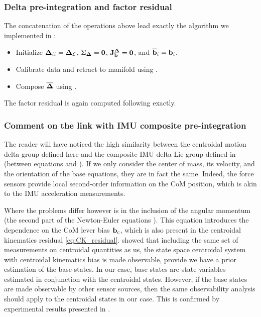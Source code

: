 \subsubsection{Delta pre-integration and factor residual}

The concatenation of the operations above lead exactly the algorithm we implemented in \cite{fourmy2021contact}:
%
\begin{itemize}
    \item Initialize ${{\bm \Delta}}_{ii} = {{\bm \Delta}}_{\mathcal{E}}$, $\Sigma_{{\bm \Delta}}=\bf0$, ${\bf J}^{{\bm \Delta}}_{\bf b} = \bf0$, and $\overline{{\bf b}}_i = {\bf b}_i$.
    \item Calibrate data and retract to manifold using .
    \item Compose $\overline{{{\bm \Delta}}}$ using .
\end{itemize}
%
The factor residual is again computed following  exactly.



\subsubsection{Comment on the link with IMU composite pre-integration}
The reader will have noticed the high similarity between the centroidal motion delta group defined here and the composite IMU delta Lie group defined 
in  (\eg between equations  and ). If we only consider the center of mass, 
its velocity, and the orientation of the base equations, they are in fact the same. 
Indeed, the force sensors provide local second-order information on the CoM position, which is akin to the IMU acceleration measurements. 

Where the problems differ however is in the inclusion of the angular momentum (the second part of the Newton-Euler equations ). This equation introduces the dependence on 
the CoM lever bias ${\bf b}_c$, which is also present in the centroidal kinematics residual \eqref{eq:CK_residual}. \cite{rotella2015humanoid} showed that including the same set of measurements on centroidal quantities as
us, the state space centroidal system with centroidal kinematics bias is made observable, provide we have a prior estimation of the base states. In our case, base states are
state variables estimated in conjunction with the centroidal states. However, if the base states are made observable by other sensor sources, then the same observability analysis
should apply to the centroidal states in our case. This is confirmed by experimental results presented in .


